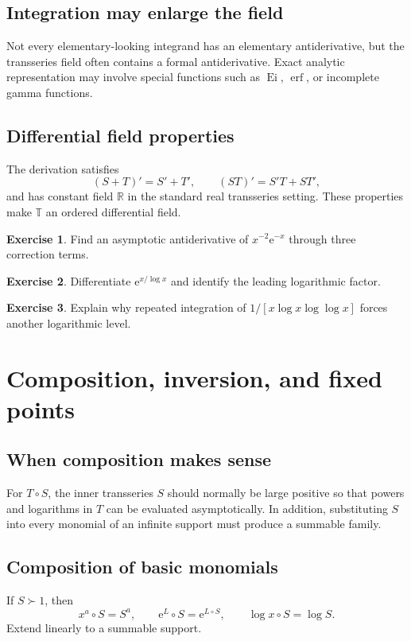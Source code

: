 \documentclass[11pt,oneside,openany]{book}
\newcommand{\R}{\mathbb{R}}
\newcommand{\T}{\mathbb{T}}
\newcommand{\Ei}{\operatorname{Ei}}
\newcommand{\erf}{\operatorname{erf}}
\newcommand{\e}{\mathrm{e}}
\newcommand{\compose}{\mathbin{\circ}}
\theoremstyle{plain}
\theoremstyle{definition}
\newtheorem{exercise}{Exercise}[chapter]
\theoremstyle{remark}
\begin{document}
\section{Integration may enlarge the field}
Not every elementary-looking integrand has an elementary antiderivative, but the transseries field often contains a formal antiderivative. Exact analytic representation may involve special functions such as $\Ei$, $\erf$, or incomplete gamma functions.

\section{Differential field properties}
The derivation satisfies
\[
  (S+T)'=S'+T',
  \qquad(ST)'=S'T+ST',
\]
and has constant field $\R$ in the standard real transseries setting. These properties make $\T$ an ordered differential field.

\begin{exercise}
Find an asymptotic antiderivative of $x^{-2}\e^{-x}$ through three correction terms.
\end{exercise}

\begin{exercise}
Differentiate $\e^{x/\log x}$ and identify the leading logarithmic factor.
\end{exercise}

\begin{exercise}
Explain why repeated integration of $1/[x\log x\log\log x]$ forces another logarithmic level.
\end{exercise}


\chapter{Composition, inversion, and fixed points}
\label{ch:composition}

\section{When composition makes sense}
For $T\compose S$, the inner transseries $S$ should normally be large positive so that powers and logarithms in $T$ can be evaluated asymptotically. In addition, substituting $S$ into every monomial of an infinite support must produce a summable family.

\section{Composition of basic monomials}
If $S\succ1$, then
\[
  x^a\compose S=S^a,
  \qquad
  \e^L\compose S=\e^{L\compose S},
  \qquad
  \log x\compose S=\log S.
\]
Extend linearly to a summable support.
\end{document}
